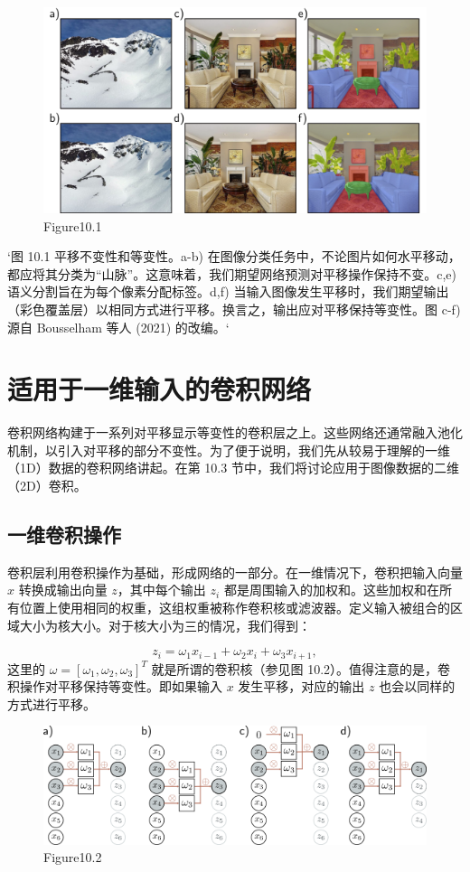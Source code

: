 \begin{figure}[h!]
\centering
\includegraphics[width=0.7\linewidth]{png/chapter10/ConvEquiInv.png}
\caption{Figure10.1}
\end{figure}

`图 10.1 平移不变性和等变性。a-b) 在图像分类任务中，不论图片如何水平移动，都应将其分类为“山脉”。这意味着，我们期望网络预测对平移操作保持不变。c,e) 语义分割旨在为每个像素分配标签。d,f) 当输入图像发生平移时，我们期望输出（彩色覆盖层）以相同方式进行平移。换言之，输出应对平移保持等变性。图 c-f) 源自 Bousselham 等人 (2021) 的改编。`

\section{适用于一维输入的卷积网络}
卷积网络构建于一系列对平移显示等变性的卷积层之上。这些网络还通常融入池化机制，以引入对平移的部分不变性。为了便于说明，我们先从较易于理解的一维（1D）数据的卷积网络讲起。在第 10.3 节中，我们将讨论应用于图像数据的二维（2D）卷积。

\subsection{一维卷积操作}
卷积层利用卷积操作为基础，形成网络的一部分。在一维情况下，卷积把输入向量 \(x\) 转换成输出向量 \(z\)，其中每个输出 \(z_i\) 都是周围输入的加权和。这些加权和在所有位置上使用相同的权重，这组权重被称作卷积核或滤波器。定义输入被组合的区域大小为核大小。对于核大小为三的情况，我们得到：

\[
z_i = \omega_1 x_{i-1} + \omega_2 x_i + \omega_3 x_{i+1}, \tag{10.3}
\]
这里的 \(\omega = [\omega_1, \omega_2, \omega_3]^T\) 就是所谓的卷积核（参见图 10.2）。值得注意的是，卷积操作对平移保持等变性。即如果输入 \(x\) 发生平移，对应的输出 \(z\) 也会以同样的方式进行平移。


\begin{figure}[h!]
\centering
\includegraphics[width=0.7\linewidth]{png/chapter10/Conv1.png}
\caption{Figure10.2}
\end{figure}

